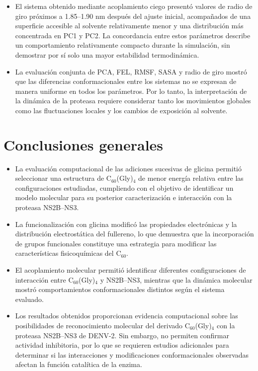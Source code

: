 \begin{itemize}
    \item El sistema obtenido mediante
    acoplamiento ciego presentó valores
    de radio de giro próximos a
    1.85--1.90 nm después del ajuste
    inicial, acompañados de una
    superficie accesible al solvente
    relativamente menor y una
    distribución más concentrada
    en PC1 y PC2. La concordancia
    entre estos parámetros describe
    un comportamiento relativamente
    compacto durante la simulación,
    sin demostrar por sí solo una
    mayor estabilidad termodinámica.

    \item La evaluación conjunta de
    PCA, FEL, RMSF, SASA y radio de giro
    mostró que las diferencias
    conformacionales entre los sistemas
    no se expresan de manera uniforme
    en todos los parámetros. Por lo
    tanto, la interpretación de la
    dinámica de la proteasa requiere
    considerar tanto los movimientos
    globales como las fluctuaciones
    locales y los cambios de exposición
    al solvente.

\end{itemize}

\section{Conclusiones generales}

\begin{itemize}

    \item La evaluación computacional
    de las adiciones sucesivas de glicina
    permitió seleccionar una estructura
    de C$_{60}$(Gly)$_4$ de menor
    energía relativa entre las
    configuraciones estudiadas,
    cumpliendo con el objetivo de
    identificar un modelo molecular
    para su posterior caracterización
    e interacción con la proteasa
    NS2B--NS3.

    \item La funcionalización con glicina
    modificó las propiedades electrónicas
    y la distribución electrostática
    del fullereno, lo que demuestra
    que la incorporación de grupos
    funcionales constituye una
    estrategia para modificar las
    características fisicoquímicas
    del C$_{60}$.

    \item El acoplamiento molecular
    permitió identificar diferentes
    configuraciones de interacción
    entre C$_{60}$(Gly)$_4$ y
    NS2B--NS3, mientras que la
    dinámica molecular mostró
    comportamientos conformacionales
    distintos según el sistema
    evaluado.

    \item Los resultados obtenidos
    proporcionan evidencia
    computacional sobre las
    posibilidades de reconocimiento
    molecular del derivado
    C$_{60}$(Gly)$_4$ con la proteasa
    NS2B--NS3 de DENV-2. Sin embargo,
    no permiten confirmar actividad
    inhibitoria, por lo que se
    requieren estudios adicionales
    para determinar si las
    interacciones y modificaciones
    conformacionales observadas
    afectan la función catalítica
    de la enzima.

\end{itemize}


